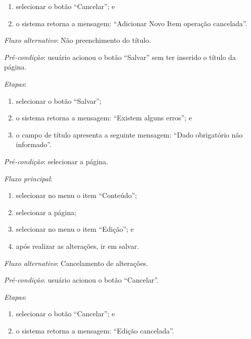 \begin{enumerate}
    \item selecionar o botão ``Cancelar''; e
    \item o sistema retorna a mensagem: ``Adicionar Novo Item operação cancelada''.
\end{enumerate}

\noindent \textit{Fluxo alternativo}: Não preenchimento do título.

\noindent \textit{Pré-condição}: usuário acionou o botão ``Salvar'' sem ter inserido o título da página.

\noindent \textit{Etapas}:

\begin{enumerate}
    \item selecionar o botão ``Salvar'';
    \item o sistema retorna a mensagem: ``Existem alguns erros''; e
    \item o campo de título apresenta a seguinte mensagem: ``Dado obrigatório não informado''.
\end{enumerate}



\vspace{0.7cm}

\noindent \textit{Pré-condição}: selecionar a página.

\noindent \textit{Fluxo principal}:

\begin{enumerate}
    \item selecionar no menu o item ``Conteúdo'';
    \item selecionar a página;
    \item selecionar no menu o item ``Edição''; e
    \item após realizar as alterações, ir em salvar.
\end{enumerate}

\noindent \textit{Fluxo alternativo}: Cancelamento de alterações.

\noindent \textit{Pré-condição}: usuário acionou o botão ``Cancelar''.

\noindent \textit{Etapas}:

\begin{enumerate}
    \item selecionar o botão ``Cancelar''; e
    \item o sistema retorna a mensagem: ``Edição cancelada''.
\end{enumerate}


